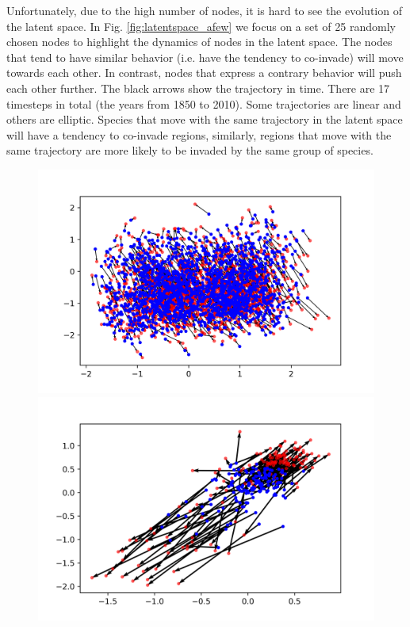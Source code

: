 \documentclass[mscthesis]{usiinfthesis}
\begin{document}
Unfortunately, due to the high number of nodes, it is hard to see the evolution of the latent space. In Fig. \ref{fig:latentspace_afew} we focus on a set of 25 randomly chosen nodes to highlight the dynamics of nodes in the latent space. The nodes that tend to have similar behavior (i.e. have the tendency to co-invade) will move towards each other. In contrast, nodes that express a contrary behavior will push each other further. The black arrows show the trajectory in time. There are 17 timesteps in total (the years from 1850 to 2010). Some trajectories are linear and others are elliptic. Species that move with the same trajectory in the latent space will have a tendency to co-invade regions, similarly, regions that move with the same trajectory are more likely to be invaded by the same group of species.


\begin{figure}[H] 
  \begin{minipage}[b]{0.5\linewidth}
    \centering
    \includegraphics[width=\linewidth]{latentspace_species.png} 
    \vspace{4ex}
  \end{minipage}%
  \begin{minipage}[b]{0.5\linewidth}
    \centering
    \includegraphics[width=\linewidth]{latentspace_region.png} 

\end{minipage}
\end{figure}
\end{document}
